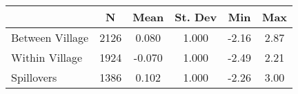 \begin{tabular}{l*{5}{c}}\hline&\multicolumn{1}{c}{N}&\multicolumn{1}{c}{Mean}&\multicolumn{1}{c}{St. Dev}&\multicolumn{1}{c}{Min}&\multicolumn{1}{c}{Max}\\ \hline 
Between Village & 2126 & 0.080 & 1.000 & -2.16 & 2.87 \\
Within Village & 1924 & -0.070 & 1.000 & -2.49 & 2.21 \\
Spillovers & 1386 & 0.102 & 1.000 & -2.26 & 3.00 \\
\hline \end{tabular}
